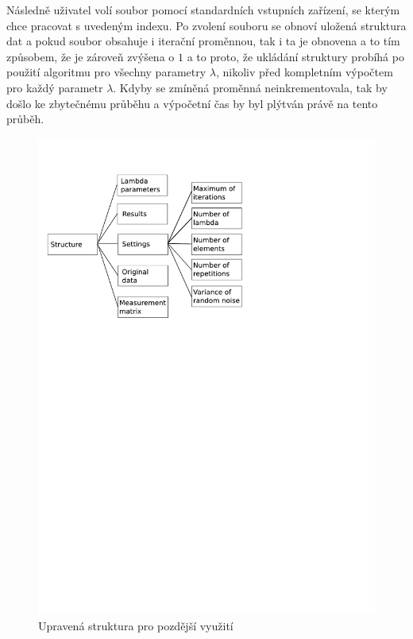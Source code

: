\documentclass[FM,BP]{tulthesis}
\begin{document}
Následně uživatel volí soubor pomocí standardních vstupních zařízení, se kterým chce pracovat s uvedeným indexu. Po zvolení souboru se obnoví uložená struktura dat a pokud soubor obsahuje i iterační proměnnou, tak i ta je obnovena a to tím způsobem, že je zároveň zvýšena o $1$ a to proto, že ukládání struktury probíhá po použití algoritmu pro všechny parametry $\lambda$, nikoliv před kompletním výpočtem pro každý parametr $\lambda$. Kdyby se zmíněná proměnná neinkrementovala, tak by došlo ke zbytečnému průběhu a výpočetní čas by byl plýtván právě na tento průběh.

\begin{figure}[!ht]
	\begin{center}
		\includegraphics[scale=0.8]{obr/structure_new.pdf}
	\end{center}
	\caption{Upravená struktura pro pozdější využití}
	\label{fig:newstruct}
\end{figure}
\end{document}
